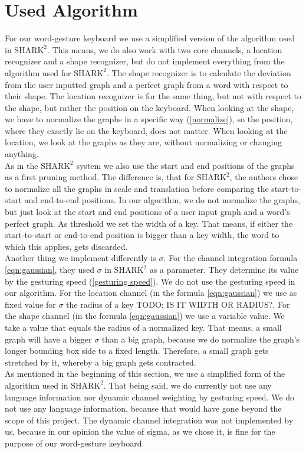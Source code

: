 \section{Used Algorithm}
For our word-gesture keyboard we use a simplified version of the algorithm used in $\text{SHARK}^2$. This means, we do also work with two core channels, a location recognizer and a shape recognizer, but do not implement everything from the algorithm used for $\text{SHARK}^2$. The shape recognizer is to calculate the deviation from the user inputted graph and a perfect graph from a word with respect to their shape. The location recognizer is for the same thing, but not with respect to the shape, but rather the position on the keyboard. When looking at the shape, we have to normalize the graphs in a specific way (\ref{normalize}), so the position, where they exactly lie on the keyboard, does not matter. When looking at the location, we look at the graphs as they are, without normalizing or changing anything.\\
As in the $\text{SHARK}^2$ system we also use the start and end positions of the graphs as a first pruning method. The difference is, that for $\text{SHARK}^2$, the authors chose to normalize all the graphs in scale and translation before comparing the start-to-start and end-to-end positions. In our algorithm, we do not normalize the graphs, but just look at the start and end positions of a user input graph and a word's perfect graph. As threshold we set the width of a key. That means, if either the start-to-start or end-to-end position is bigger than a key width, the word to which this applies, gets discarded.\\
Another thing we implement differently is $\sigma$. For the channel integration formula \ref{eqn:gaussian}, they used $\sigma$ in $\text{SHARK}^2$ as a parameter. They determine its value by the gesturing speed (\ref{gesturing speed}). We do not use the gesturing speed in our algorithm. For the location channel (in the formula \ref{eqn:gaussian}) we use as fixed value for $\sigma$ the radius of a key TODO: IS IT WIDTH OR RADIUS?. For the shape channel (in the formula \ref{eqn:gaussian}) we use a variable value. We take a value that equals the radius of a normalized key. That means, a small graph will have a bigger $\sigma$ than a big graph, because we do normalize the graph's longer bounding box side to a fixed length. Therefore, a small graph gets stretched by it, whereby a big graph gets contracted.\\
As mentioned in the beginning of this section, we use a simplified form of the algorithm used in $\text{SHARK}^2$. That being said, we do currently not use any language information nor dynamic channel weighting by gesturing speed. We do not use any language information, because that would have gone beyond the scope of this project. The dynamic channel integration was not implemented by us, because in our opinion the value of sigma, as we chose it, is fine for the purpose of our word-gesture keyboard.


